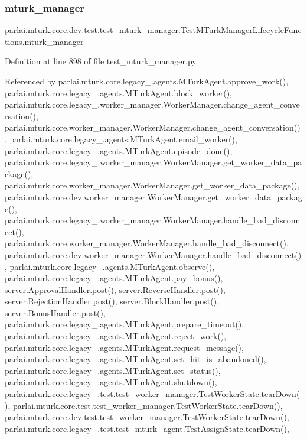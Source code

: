 \subsubsection{\texorpdfstring{mturk\+\_\+manager}{mturk\_manager}}
{\footnotesize\ttfamily parlai.\+mturk.\+core.\+dev.\+test.\+test\+\_\+mturk\+\_\+manager.\+Test\+M\+Turk\+Manager\+Lifecycle\+Functions.\+mturk\+\_\+manager}



Definition at line 898 of file test\+\_\+mturk\+\_\+manager.\+py.



Referenced by parlai.\+mturk.\+core.\+legacy\+\_.\+agents.\+M\+Turk\+Agent.\+approve\+\_\+work(), parlai.\+mturk.\+core.\+legacy\+\_.\+agents.\+M\+Turk\+Agent.\+block\+\_\+worker(), parlai.\+mturk.\+core.\+legacy\+\_.\+worker\+\_\+manager.\+Worker\+Manager.\+change\+\_\+agent\+\_\+conversation(), parlai.\+mturk.\+core.\+worker\+\_\+manager.\+Worker\+Manager.\+change\+\_\+agent\+\_\+conversation(), parlai.\+mturk.\+core.\+legacy\+\_.\+agents.\+M\+Turk\+Agent.\+email\+\_\+worker(), parlai.\+mturk.\+core.\+legacy\+\_.\+agents.\+M\+Turk\+Agent.\+episode\+\_\+done(), parlai.\+mturk.\+core.\+legacy\+\_.\+worker\+\_\+manager.\+Worker\+Manager.\+get\+\_\+worker\+\_\+data\+\_\+package(), parlai.\+mturk.\+core.\+worker\+\_\+manager.\+Worker\+Manager.\+get\+\_\+worker\+\_\+data\+\_\+package(), parlai.\+mturk.\+core.\+dev.\+worker\+\_\+manager.\+Worker\+Manager.\+get\+\_\+worker\+\_\+data\+\_\+package(), parlai.\+mturk.\+core.\+legacy\+\_.\+worker\+\_\+manager.\+Worker\+Manager.\+handle\+\_\+bad\+\_\+disconnect(), parlai.\+mturk.\+core.\+worker\+\_\+manager.\+Worker\+Manager.\+handle\+\_\+bad\+\_\+disconnect(), parlai.\+mturk.\+core.\+dev.\+worker\+\_\+manager.\+Worker\+Manager.\+handle\+\_\+bad\+\_\+disconnect(), parlai.\+mturk.\+core.\+legacy\+\_.\+agents.\+M\+Turk\+Agent.\+observe(), parlai.\+mturk.\+core.\+legacy\+\_.\+agents.\+M\+Turk\+Agent.\+pay\+\_\+bonus(), server.\+Approval\+Handler.\+post(), server.\+Reverse\+Handler.\+post(), server.\+Rejection\+Handler.\+post(), server.\+Block\+Handler.\+post(), server.\+Bonus\+Handler.\+post(), parlai.\+mturk.\+core.\+legacy\+\_.\+agents.\+M\+Turk\+Agent.\+prepare\+\_\+timeout(), parlai.\+mturk.\+core.\+legacy\+\_.\+agents.\+M\+Turk\+Agent.\+reject\+\_\+work(), parlai.\+mturk.\+core.\+legacy\+\_.\+agents.\+M\+Turk\+Agent.\+request\+\_\+message(), parlai.\+mturk.\+core.\+legacy\+\_.\+agents.\+M\+Turk\+Agent.\+set\+\_\+hit\+\_\+is\+\_\+abandoned(), parlai.\+mturk.\+core.\+legacy\+\_.\+agents.\+M\+Turk\+Agent.\+set\+\_\+status(), parlai.\+mturk.\+core.\+legacy\+\_.\+agents.\+M\+Turk\+Agent.\+shutdown(), parlai.\+mturk.\+core.\+legacy\+\_.\+test.\+test\+\_\+worker\+\_\+manager.\+Test\+Worker\+State.\+tear\+Down(), parlai.\+mturk.\+core.\+test.\+test\+\_\+worker\+\_\+manager.\+Test\+Worker\+State.\+tear\+Down(), parlai.\+mturk.\+core.\+dev.\+test.\+test\+\_\+worker\+\_\+manager.\+Test\+Worker\+State.\+tear\+Down(), parlai.\+mturk.\+core.\+legacy\+\_.\+test.\+test\+\_\+mturk\+\_\+agent.\+Test\+Assign\+State.\+tear\+Down(), 
